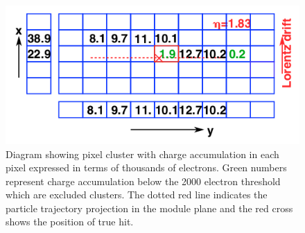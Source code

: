 \begin{figure}[H]
  \centering
  \includegraphics[width=0.6\columnwidth]{./pixel_reco.png}
  \caption{ \onehalfspacing Diagram showing pixel cluster with charge accumulation in each pixel expressed in terms of thousands of electrons. Green numbers represent charge accumulation below the 2000 electron threshold which are excluded clusters. The dotted red line indicates the particle trajectory projection in the module plane and the red cross shows the position of true hit.}
  \label{fig:CMS}
\end{figure}








